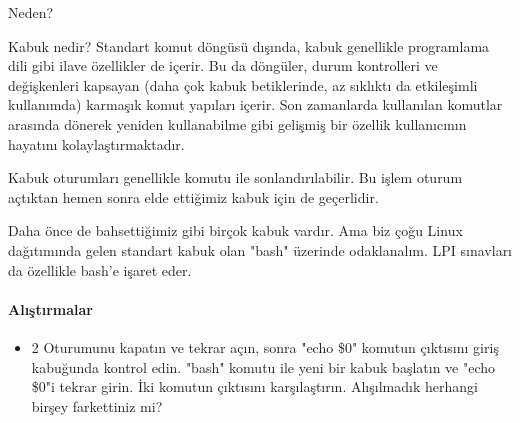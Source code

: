 \begin{section}{Neden?}
\begin{subsection}{Kabuk nedir?}
Standart komut döngüsü dışında, kabuk genellikle programlama dili gibi ilave özellikler de içerir. Bu da döngüler, durum kontrolleri ve değişkenleri kapsayan (daha çok kabuk betiklerinde, az sıklıktı da etkileşimli kullanımda) karmaşık komut yapıları içerir. Son zamanlarda kullanılan komutlar arasında dönerek yeniden kullanabilme gibi gelişmiş bir özellik kullanıcının hayatını kolaylaştırmaktadır.

Kabuk oturumları genellikle  komutu ile sonlandırılabilir. Bu işlem oturum açtıktan hemen sonra elde ettiğimiz kabuk için de geçerlidir.

Daha önce de bahsettiğimiz gibi birçok kabuk vardır. Ama biz çoğu Linux dağıtımında gelen standart kabuk olan "bash" üzerinde odaklanalım. LPI sınavları da özellikle bash'e işaret eder.
\paragraph{Alıştırmalar}{
\begin{itemize}
 \item 2 Oturumunu kapatın ve tekrar açın, sonra "echo \$0" komutun çıktısını giriş kabuğunda kontrol edin. "bash" komutu ile yeni bir kabuk başlatın ve "echo \$0"i tekrar girin. İki komutun çıktısını karşılaştırın. Alışılmadık herhangi birşey farkettiniz mi?
\end{itemize}}
\end{subsection}
\end{section}
